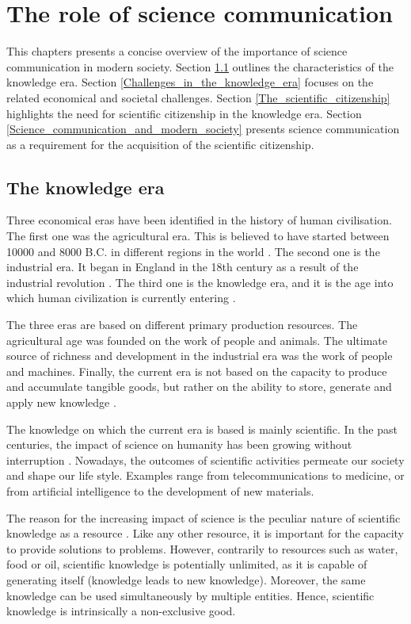 \chapter{The role of science communication}
This chapters presents a concise overview of the importance of science communication in modern society. Section \ref{The_knowledge_era} outlines the characteristics of the knowledge era. Section \ref{Challenges_in_the_knowledge_era} focuses on the related economical and societal challenges. Section \ref{The_scientific_citizenship} highlights the need for scientific citizenship in the knowledge era. Section \ref{Science_communication_and_modern_society} presents science communication as a requirement for the acquisition of the scientific citizenship. 

\section{The knowledge era} \label{The_knowledge_era}
Three economical eras have been identified in the history of human civilisation. The first one was the agricultural era. This is believed to have started between 10000 and 8000 B.C. in different regions in the world \cite{Bocquet,Barker}. The second one is the industrial era. It began in England in the 18th century as a result of the industrial revolution \cite{Trinder, Griffin}. The third one is the knowledge era, and it is the age into which human civilization is currently entering \cite{Bohme-Stehr}. 

The three eras are based on different primary production resources. The agricultural age was founded on the work of people and animals. The ultimate source of richness and development in the industrial era was the work of people and machines. Finally, the current era is not based on the capacity to produce and accumulate tangible goods, but rather on the ability to store, generate and apply new knowledge \cite{Powell}.

The knowledge on which the current era is based is mainly scientific. In the past centuries, the impact of science on humanity has been growing without interruption \cite{Pickstone}. Nowadays, the outcomes of scientific activities permeate our society and shape our life style. Examples range from telecommunications to medicine, or from artificial intelligence to the development of new materials.

The reason for the increasing impact of science is the peculiar nature of scientific knowledge as a resource \cite{Probst}. Like any other resource, it is important for the capacity to provide solutions to problems. However, contrarily to resources such as water, food or oil, scientific knowledge is potentially unlimited, as it is capable of generating itself (knowledge leads to new knowledge). Moreover, the same knowledge can be used simultaneously by multiple entities. Hence, scientific knowledge is intrinsically a non-exclusive good.

